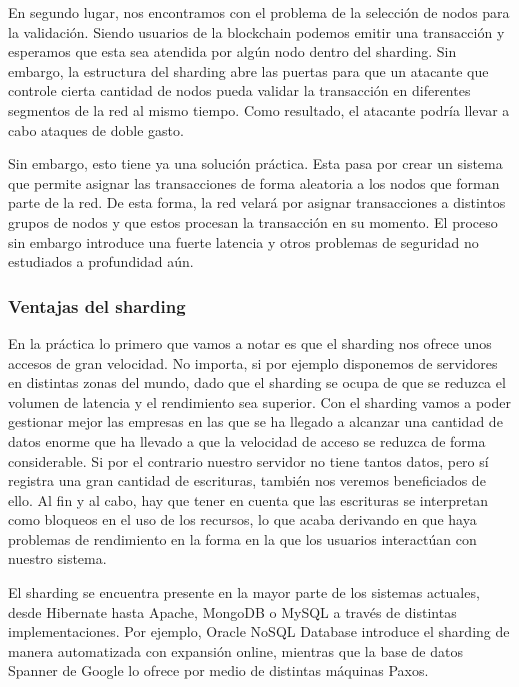 \documentclass[twoside,twocolumn]{article}
\begin{document}
En segundo lugar, nos encontramos con el problema de la selección
 de nodos para la validación. Siendo usuarios de la blockchain podemos
  emitir una transacción y esperamos que esta sea atendida por algún nodo
   dentro del sharding. Sin embargo, la estructura del sharding abre las 
   puertas para que un atacante que controle cierta cantidad de nodos pueda
    validar la transacción en diferentes segmentos de la red al mismo tiempo.
     Como resultado, el atacante podría llevar a cabo ataques de doble gasto.

Sin embargo, esto tiene ya una solución práctica.
 Esta pasa por crear un sistema que permite asignar las 
 transacciones de forma aleatoria a los nodos que forman parte
  de la red. De esta forma, la red velará por asignar transacciones
   a distintos grupos de nodos y que estos procesan la transacción 
   en su momento. El proceso sin embargo introduce una fuerte latencia 
   y otros problemas de seguridad no estudiados a profundidad aún.
\subsubsection{Ventajas del sharding}

En la práctica lo primero que vamos a notar es que el sharding nos ofrece unos 
accesos de gran velocidad. No importa, si por ejemplo disponemos de servidores 
en distintas zonas del mundo, dado que el sharding se ocupa de que se reduzca 
el volumen de latencia y el rendimiento sea superior. Con el sharding vamos a 
poder gestionar mejor las empresas en las que se ha llegado a alcanzar una 
cantidad de datos enorme que ha llevado a que la velocidad de acceso se reduzca 
de forma considerable. Si por el contrario nuestro servidor no tiene tantos datos,
 pero sí registra una gran cantidad de escrituras, también nos veremos 
 beneficiados de ello. Al fin y al cabo, hay que tener en cuenta que las
  escrituras se interpretan como bloqueos en el uso de los recursos, lo que
   acaba derivando en que haya problemas de rendimiento en la forma en la que 
   los usuarios interactúan con nuestro sistema.

El sharding se encuentra presente en la mayor parte de los sistemas actuales,
 desde Hibernate hasta Apache, MongoDB o MySQL a través de distintas 
 implementaciones. Por ejemplo, Oracle NoSQL Database introduce el sharding
  de manera automatizada con expansión online, mientras que la base de datos 
  Spanner de Google lo ofrece por medio de distintas máquinas Paxos.
\end{document}
